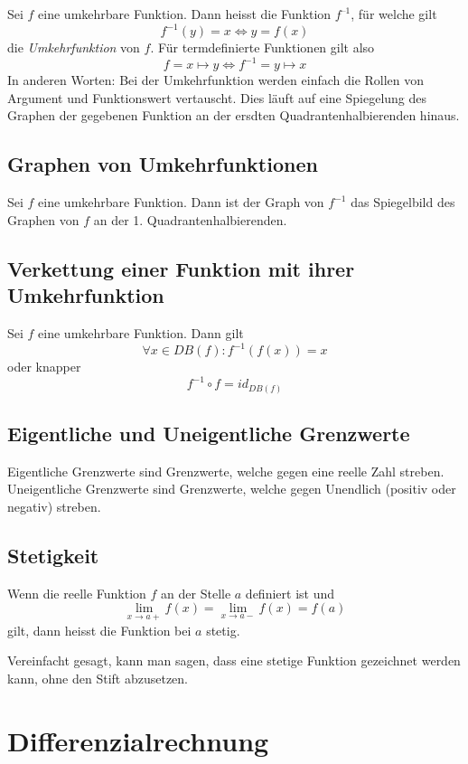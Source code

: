 \documentclass[10pt,a4paper]{article}
\begin{document}
Sei $f$ eine umkehrbare Funktion. Dann heisst die Funktion $f^{–1}$, für welche gilt
$$f^{-1}(y) = x \Leftrightarrow y = f(x)$$
die \textit{Umkehrfunktion} von $f$. Für termdefinierte Funktionen gilt also
$$f = x \mapsto y \Leftrightarrow f^{-1} = y \mapsto x$$
In anderen Worten: Bei der Umkehrfunktion werden einfach die Rollen von Argument und Funktionswert vertauscht. Dies läuft auf eine Spiegelung des Graphen der gegebenen Funktion an der ersdten Quadrantenhalbierenden hinaus.


\subsection{Graphen von Umkehrfunktionen}

Sei $f$ eine umkehrbare Funktion. Dann ist der Graph von $f^{-1}$ das Spiegelbild des Graphen von $f$ an der 1. Quadrantenhalbierenden.


\subsection{Verkettung einer Funktion mit ihrer Umkehrfunktion}

Sei $f$ eine umkehrbare Funktion. Dann gilt
$$\forall x \in DB(f): f^{-1}(f(x)) = x$$
oder knapper
$$f^{-1} \circ f = id_{DB(f)}$$

\subsection{Eigentliche und Uneigentliche Grenzwerte}

Eigentliche Grenzwerte sind Grenzwerte, welche gegen eine reelle Zahl streben. Uneigentliche Grenzwerte sind Grenzwerte, welche gegen Unendlich (positiv oder negativ) streben.

\subsection{Stetigkeit}

Wenn die reelle Funktion $f$ an der Stelle $a$ definiert ist und
$$\lim_{x \to a+} f(x) = \lim_{x \to a-} f(x) = f(a)$$
gilt, dann heisst die Funktion bei $a$ stetig.

Vereinfacht gesagt, kann man sagen, dass eine stetige Funktion gezeichnet werden kann, ohne den Stift abzusetzen.



\section{Differenzialrechnung}
\end{document}
